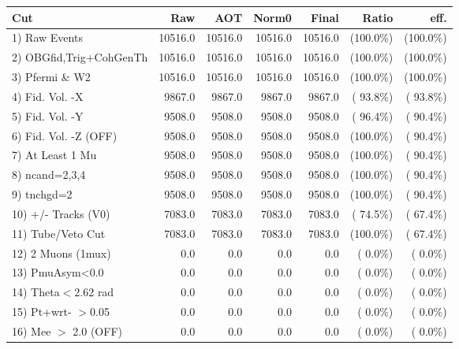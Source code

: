  \begin{table}[h!]\centering
 \begin{tabular}{||l||r|r|r|r|r|r||}
 \hline
 \hline
 Cut & Raw & AOT & Norm0 & Final & Ratio & eff.       \\
 \hline
  1) Raw Events           &      10516.0 &      10516.0 &      10516.0 &      10516.0 & (100.0\%) & (100.0\%) \\
  2) OBGfid,Trig+CohGenTh &      10516.0 &      10516.0 &      10516.0 &      10516.0 & (100.0\%) & (100.0\%) \\
  3) Pfermi \& W2         &      10516.0 &      10516.0 &      10516.0 &      10516.0 & (100.0\%) & (100.0\%) \\
  4) Fid. Vol. -X         &       9867.0 &       9867.0 &       9867.0 &       9867.0 & ( 93.8\%) & ( 93.8\%) \\
  5) Fid. Vol. -Y         &       9508.0 &       9508.0 &       9508.0 &       9508.0 & ( 96.4\%) & ( 90.4\%) \\
  6) Fid. Vol. -Z (OFF)   &       9508.0 &       9508.0 &       9508.0 &       9508.0 & (100.0\%) & ( 90.4\%) \\
  7) At Least 1 Mu        &       9508.0 &       9508.0 &       9508.0 &       9508.0 & (100.0\%) & ( 90.4\%) \\
  8) ncand=2,3,4          &       9508.0 &       9508.0 &       9508.0 &       9508.0 & (100.0\%) & ( 90.4\%) \\
  9) tnchgd=2             &       9508.0 &       9508.0 &       9508.0 &       9508.0 & (100.0\%) & ( 90.4\%) \\
 10) +/- Tracks (V0)      &       7083.0 &       7083.0 &       7083.0 &       7083.0 & ( 74.5\%) & ( 67.4\%) \\
 11) Tube/Veto Cut        &       7083.0 &       7083.0 &       7083.0 &       7083.0 & (100.0\%) & ( 67.4\%) \\
 12) 2 Muons (1mux)       &          0.0 &          0.0 &          0.0 &          0.0 & (  0.0\%) & (  0.0\%) \\
 13) PmuAsym<0.0          &          0.0 &          0.0 &          0.0 &          0.0 & (  0.0\%) & (  0.0\%) \\
 14) Theta$<$2.62 rad     &          0.0 &          0.0 &          0.0 &          0.0 & (  0.0\%) & (  0.0\%) \\
 15) Pt+wrt- $>$0.05      &          0.0 &          0.0 &          0.0 &          0.0 & (  0.0\%) & (  0.0\%) \\
 16) Mee $>$ 2.0  (OFF)   &          0.0 &          0.0 &          0.0 &          0.0 & (  0.0\%) & (  0.0\%) \\

\end{tabular}
\end{table}
